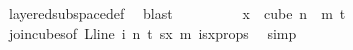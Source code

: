 \begin{isabellebody}
\ layered{\isacharunderscore}{\kern0pt}subspace{\isacharunderscore}{\kern0pt}def\ \isamarkupfalse%
\ blast\isanewline
\ \ \ \ \ \ \isamarkupfalse%
\ \isamarkupfalse%
\ {\isachardoublequoteopen}x\ {\isasymin}\ cube\ {\isacharparenleft}{\kern0pt}n\ {\isacharplus}{\kern0pt}\ m{\isacharparenright}{\kern0pt}\ {\isacharparenleft}{\kern0pt}t{\isacharplus}{\kern0pt}{}{\isacharparenright}{\kern0pt}{\isachardoublequoteclose}\ \isamarkupfalse%
\ join{\isacharunderscore}{\kern0pt}cubes{\isacharbrackleft}{\kern0pt}of\ {\isachardoublequoteopen}L{\isacharunderscore}{\kern0pt}line\ i{\isachardoublequoteclose}\ {\isachardoublequoteopen}n{\isachardoublequoteclose}\ {\isachardoublequoteopen}t{\isachardoublequoteclose}\ sx\ m{\isacharbrackright}{\kern0pt}\ isx{\isacharunderscore}{\kern0pt}props\ \isamarkupfalse%
\ simp\ \isanewline
\ \ \ \ \isamarkupfalse%
\isanewline
\isanewline
\isanewline
\isanewline
\isanewline
\isanewline
\ \ \ \ \isamarkupfalse%

\end{isabellebody}
